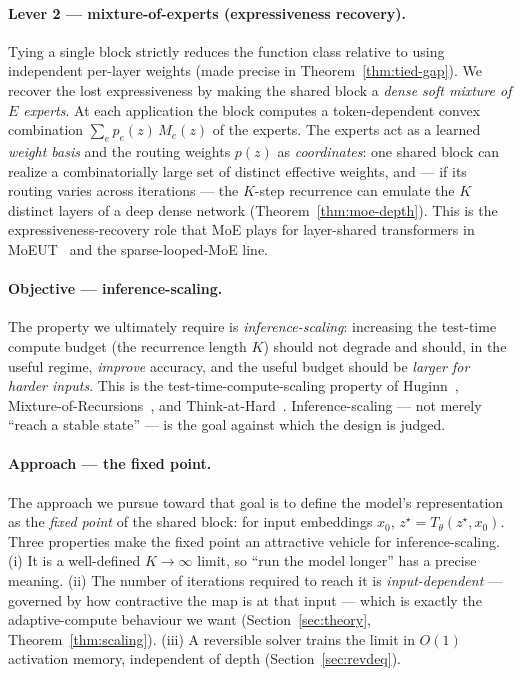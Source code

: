 \documentclass[11pt]{article}
\begin{document}
\paragraph{Lever 2 --- mixture-of-experts (expressiveness recovery).}
Tying a single block strictly reduces the function class relative to using
independent per-layer weights (made precise in Theorem~\ref{thm:tied-gap}).  We
recover the lost expressiveness by making the shared block a \emph{dense soft
mixture of $E$ experts}.  At each application the block computes a
token-dependent convex combination $\sum_e p_e(z)\,M_e(z)$ of the experts.  The
experts act as a learned \emph{weight basis} and the routing weights $p(z)$ as
\emph{coordinates}: one shared block can realize a combinatorially large set of
distinct effective weights, and --- if its routing varies across iterations ---
the $K$-step recurrence can emulate the $K$ distinct layers of a deep dense
network (Theorem~\ref{thm:moe-depth}).  This is the expressiveness-recovery role
that MoE plays for layer-shared transformers in MoEUT~\cite{moeut} and the
sparse-looped-MoE line.

\paragraph{Objective --- inference-scaling.}
The property we ultimately require is \emph{inference-scaling}: increasing the
test-time compute budget (the recurrence length $K$) should not degrade and
should, in the useful regime, \emph{improve} accuracy, and the useful budget
should be \emph{larger for harder inputs}.  This is the test-time-compute-scaling
property of Huginn~\cite{huginn}, Mixture-of-Recursions~\cite{mor}, and
Think-at-Hard~\cite{tah}.  Inference-scaling --- not merely ``reach a stable
state'' --- is the goal against which the design is judged.

\paragraph{Approach --- the fixed point.}
The approach we pursue toward that goal is to define the model's representation as
the \emph{fixed point} of the shared block: for input embeddings $x_0$,
$z^\star = T_\theta(z^\star, x_0)$.  Three properties make the fixed point an
attractive vehicle for inference-scaling.  (i) It is a well-defined
$K\!\to\!\infty$ limit, so ``run the model longer'' has a precise meaning.
(ii) The number of iterations required to reach it is \emph{input-dependent} ---
governed by how contractive the map is at that input --- which is exactly the
adaptive-compute behaviour we want (Section~\ref{sec:theory},
Theorem~\ref{thm:scaling}).  (iii) A reversible solver trains the limit in $O(1)$
activation memory, independent of depth (Section~\ref{sec:revdeq}).
\end{document}
